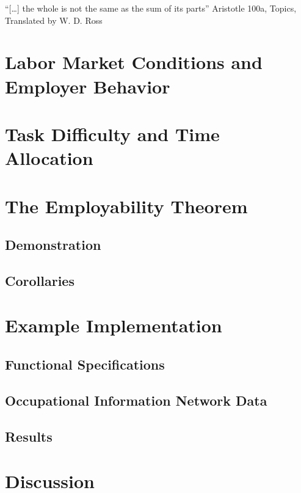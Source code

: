 \documentclass[hidelinks, nonatbib]{elsarticle}
\begin{document}
``[\dots] the whole is not the same as the sum of its parts''
Aristotle 100a, Topics, Translated by W. D. Ross
\OCL

\section{Labor Market Conditions and Employer Behavior}
\RA
\HA

\section{Task Difficulty and Time Allocation}
\TDA


\section{The Employability Theorem}
\subsection{Demonstration}
\ET

\subsection{Corollaries}
\PCC

\AEC

\OCC

\ACC


\section{Example Implementation}
\subsection{Functional Specifications}
\subsection{Occupational Information Network Data}
\subsection{Results}


\section{Discussion}
\end{document}
